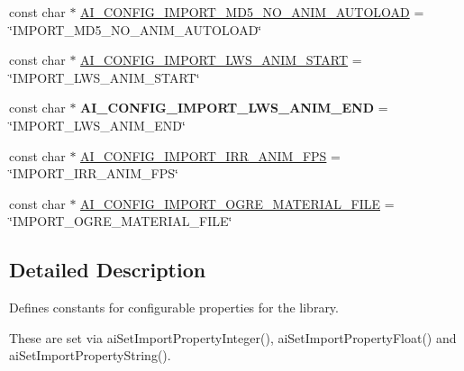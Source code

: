 \begin{DoxyCompactItemize}
\item 
const char $\ast$ \hyperlink{namespaceassimp_1_1config_a2194512ebb20be6f70d5a20632868aa7}{A\+I\+\_\+\+C\+O\+N\+F\+I\+G\+\_\+\+I\+M\+P\+O\+R\+T\+\_\+\+M\+D5\+\_\+\+N\+O\+\_\+\+A\+N\+I\+M\+\_\+\+A\+U\+T\+O\+L\+O\+A\+D} = \char`\"{}I\+M\+P\+O\+R\+T\+\_\+\+M\+D5\+\_\+\+N\+O\+\_\+\+A\+N\+I\+M\+\_\+\+A\+U\+T\+O\+L\+O\+A\+D\char`\"{}
\item 
const char $\ast$ \hyperlink{namespaceassimp_1_1config_a5a751fc4d3f71fd8dd404f9c41848a0a}{A\+I\+\_\+\+C\+O\+N\+F\+I\+G\+\_\+\+I\+M\+P\+O\+R\+T\+\_\+\+L\+W\+S\+\_\+\+A\+N\+I\+M\+\_\+\+S\+T\+A\+R\+T} = \char`\"{}I\+M\+P\+O\+R\+T\+\_\+\+L\+W\+S\+\_\+\+A\+N\+I\+M\+\_\+\+S\+T\+A\+R\+T\char`\"{}
\item 
\hypertarget{namespaceassimp_1_1config_af2c988e6cbb63a793c27da5678a6a578}{const char $\ast$ {\bfseries A\+I\+\_\+\+C\+O\+N\+F\+I\+G\+\_\+\+I\+M\+P\+O\+R\+T\+\_\+\+L\+W\+S\+\_\+\+A\+N\+I\+M\+\_\+\+E\+N\+D} = \char`\"{}I\+M\+P\+O\+R\+T\+\_\+\+L\+W\+S\+\_\+\+A\+N\+I\+M\+\_\+\+E\+N\+D\char`\"{}}\label{namespaceassimp_1_1config_af2c988e6cbb63a793c27da5678a6a578}

\item 
const char $\ast$ \hyperlink{namespaceassimp_1_1config_afae04fdd537f47da239818c7d7699d69}{A\+I\+\_\+\+C\+O\+N\+F\+I\+G\+\_\+\+I\+M\+P\+O\+R\+T\+\_\+\+I\+R\+R\+\_\+\+A\+N\+I\+M\+\_\+\+F\+P\+S} = \char`\"{}I\+M\+P\+O\+R\+T\+\_\+\+I\+R\+R\+\_\+\+A\+N\+I\+M\+\_\+\+F\+P\+S\char`\"{}
\item 
const char $\ast$ \hyperlink{namespaceassimp_1_1config_aa6d8f2b5cf8b40f75a81004604fe1041}{A\+I\+\_\+\+C\+O\+N\+F\+I\+G\+\_\+\+I\+M\+P\+O\+R\+T\+\_\+\+O\+G\+R\+E\+\_\+\+M\+A\+T\+E\+R\+I\+A\+L\+\_\+\+F\+I\+L\+E} = \char`\"{}I\+M\+P\+O\+R\+T\+\_\+\+O\+G\+R\+E\+\_\+\+M\+A\+T\+E\+R\+I\+A\+L\+\_\+\+F\+I\+L\+E\char`\"{}
\end{DoxyCompactItemize}


\subsection{Detailed Description}
Defines constants for configurable properties for the library.

These are set via {\ttfamily ai\+Set\+Import\+Property\+Integer()}, {\ttfamily ai\+Set\+Import\+Property\+Float()} and {\ttfamily ai\+Set\+Import\+Property\+String()}. 

